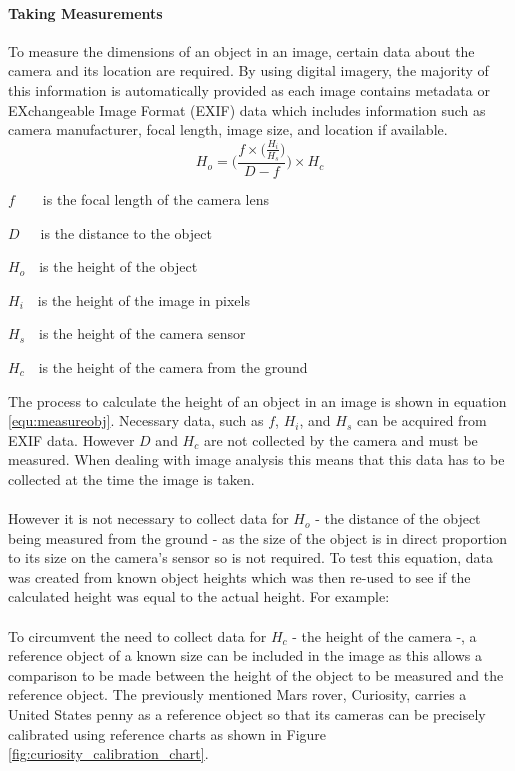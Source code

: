 	\paragraph{Taking Measurements}\label{sec:taking_measurements}
		To measure the dimensions of an object in an image, certain data about the camera and its location are required. By using digital imagery, the majority of this information is automatically provided as each image contains metadata or EXchangeable Image Format (EXIF) data which includes information such as camera manufacturer, focal length, image size, and location if available.
	\begin{equation}
		\label{equ:measureobj}
		H_{o} = \Bigg(\frac{f\times\big(\frac{H_{i}}{H_{s}}\big)}{D - f}\Bigg)\times H_{c}
	\end{equation}
	\begin{where}
		\item $f$~~~~is the focal length of the camera lens
		\item $D$~~~is the distance to the object
		\item $H_{o}$~~is the height of the object
		\item $H_{i}$~~is the height of the image in pixels
		\item $H_{s}$~~is the height of the camera sensor
		\item $H_{c}$~~is the height of the camera from the ground
	\end{where}
	\vspace{5mm}
	The process to calculate the height of an object in an image is shown in equation \ref{equ:measureobj}. Necessary data, such as $f$, $H_i$, and $H_s$ can be acquired from EXIF data. However $D$ and $H_c$ are not collected by the camera and must be measured. When dealing with image analysis this means that this data has to be collected at the time the image is taken.
	\\\\
	However it is not necessary to collect data for $H_o$ - the distance of the object being measured from the ground - as the size of the object is in direct proportion to its size on the camera’s sensor so is not required. To test this equation, data was created from known object heights which was then re-used to see if the calculated height was equal to the actual height. For example:
	\\\\
	To circumvent the need to collect data for $H_c$ - the height of the camera -, a reference object of a known size can be included in the image as this allows a comparison to be made between the height of the object to be measured and the reference object. The previously mentioned Mars rover, Curiosity, carries a United States penny as a reference object so that its cameras can be precisely calibrated using reference charts as shown in Figure \ref{fig:curiosity_calibration_chart}.
